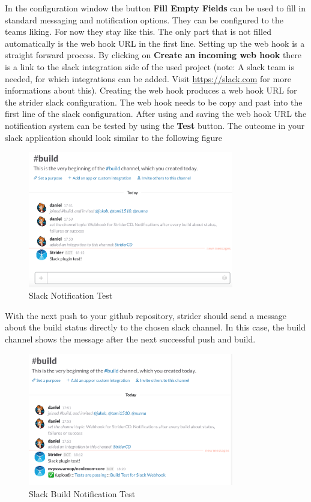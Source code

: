 In the configuration window the button \textbf{Fill Empty Fields} can be used to fill in standard messaging and notification options. They can be
configured to the teams liking. For now they stay like this. The only part that is not filled automatically is the web hook URL in the first line.
Setting up the web hook is a straight forward process. By clicking on \textbf{Create an incoming web hook} there is a link to the slack integration
side of the used project (note: A slack team is needed, for which integrations can be added. Visit \url{https://slack.com} for more informations about
this). Creating the web hook produces a web hook URL for the strider slack configuration. The web hook needs to be copy and past into the first line
of the slack configuration. After using and saving the web hook URL the notification system can be tested by using the \textbf{Test} button.
The outcome in your slack application should look similar to the following figure

\begin{figure}[h!]
  \centering
  \includegraphics[width=0.8\textwidth]{images/slack_test.png}
  \caption{Slack Notification Test}
\end{figure}

With the next push to your github repository, strider should send a message about the build status directly to the chosen slack channel.
In this case, the build channel shows the message after the next successful push and build.

\begin{figure}[h!]
  \centering
  \includegraphics[width=0.8\textwidth]{images/slack_buildtest.png}
  \caption{Slack Build Notification Test}
\end{figure}

